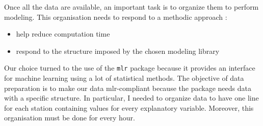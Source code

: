 \documentclass[12pt,twoside]{reedthesis}
\providecommand{\tightlist}{%
  \setlength{\itemsep}{0pt}\setlength{\parskip}{0pt}}
\theoremstyle{definition}
\theoremstyle{definition}
\theoremstyle{definition}
\theoremstyle{remark}
\begin{document}
Once all the data are available, an important task is to organize them
to perform modeling. This organisation needs to respond to a methodic
approach :
\begin{itemize}
\tightlist
\item
  help reduce computation time
\item
  respond to the structure imposed by the chosen modeling library
\end{itemize}
Our choice turned to the use of the \texttt{mlr} package because it
provides an interface for machine learning using a lot of statistical
methods. The objective of data preparation is to make our data
mlr-compliant because the package needs data with a specific structure.
In particular, I needed to organize data to have one line for each
station containing values for every explanatory variable. Moreover, this
organisation must be done for every hour.
\end{document}
